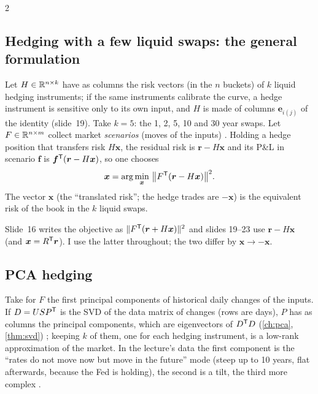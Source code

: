 \begin{paracol}{2}
\subsection{Hedging with a few liquid swaps: the general formulation}\label{ch20:sec-hedgeform}
Let $H\in\mathbb{R}^{n\times k}$ have as columns the risk vectors (in the $n$ buckets) of $k$ liquid hedging instruments; if the same instruments calibrate the curve, a hedge instrument
is sensitive only to its own input, and $H$ is made of columns $\bm e_{i(j)}$ of the identity (slide~19). Take $k=5$: the 1, 2, 5, 10 and 30 year swaps. Let $F\in\mathbb{R}^{n\times m}$ collect market
\emph{scenarios} (moves of the inputs) . Holding a hedge position that transfers risk $H\bm x$, the residual risk is $\bm r-H\bm x$ and its P\&L in scenario $\bm f$ is $\bm f^{\mathsf T}(\bm r-H\bm x)$, so one
chooses
\begin{equation}\label{ch20:eq-hedgeopt}
  \bm x=\arg\min_{\bm x}\ \bigl\|F^{\mathsf T}(\bm r-H\bm x)\bigr\|^2 .
\end{equation}
The vector $\bm x$ (the ``translated risk''; the hedge trades are $-\bm x$) is the equivalent risk of the book in the $k$ liquid swaps.

\begin{coursenote}
Slide~16 writes the objective as $\|F^{\mathsf T}(\bm r+H\bm x)\|^2$ and slides 19--23 use $\bm r-H\bm x$ (and $\bm x=R^{\mathsf T}\bm r$). I use the latter throughout; the two differ by $\bm x\to-\bm x$.
\end{coursenote}

\subsection{PCA hedging}\label{ch20:sec-pcahedge}
Take for $F$ the first principal components of historical daily changes of the inputs. If $D=USP^{\mathsf T}$ is the SVD of the data matrix of changes (rows are days),
$P$ has as columns the principal components, which are eigenvectors of $D^{\mathsf T} D$ (\cref{ch:pca}, \cref{thm:svd}) ; keeping $k$ of them, one for each hedging instrument, is a low-rank
approximation of the market. In the lecture's data the first component is the ``rates do not move now but move in the future'' mode (steep up to 10 years,
flat afterwards, because the Fed is holding), the second is a tilt, the third more complex .


\end{paracol}
